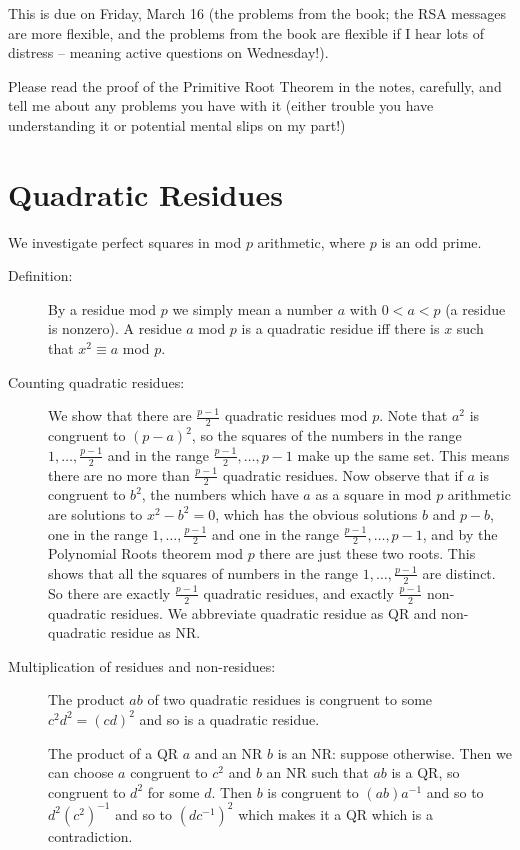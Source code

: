 \documentclass[12pt]{article}
\begin{document}
This is due on Friday, March 16 (the problems from the book; the RSA messages are more flexible, and the problems from the book are flexible if I hear lots of distress -- meaning active questions on Wednesday!).

Please read the proof of the Primitive Root Theorem in the notes, carefully, and tell me about any problems you have with it (either trouble you have understanding it or potential mental slips on my part!)

\section{Quadratic Residues}

We investigate perfect squares in mod $p$ arithmetic, where $p$ is an odd prime.

\begin{description}

\item[Definition:]  By a residue mod $p$ we simply mean a number $a$ with $0 < a <p$ (a residue is nonzero).  A residue $a$ mod $p$ is a quadratic residue iff there is $x$ such that $x^2 \equiv a$ mod $p$.

\item[Counting quadratic residues:]  We show that there are $\frac{p-1}2$ quadratic residues mod $p$.   Note that $a^2$ is congruent to $(p-a)^2$, so the squares of the numbers in the range $1,\ldots,\frac{p-1}2$ and in the range $\frac{p-1}2,\ldots,p-1$ make up the same set.
This means there are no more than $\frac{p-1}2$ quadratic residues.   Now observe that if $a$ is congruent to $b^2$, the numbers which have $a$ as a square in mod $p$ arithmetic are solutions to $x^2-b^2=0$, which has the obvious solutions $b$ and $p-b$, one in  the range $1,\ldots,\frac{p-1}2$ and one in the range $\frac{p-1}2,\ldots,p-1$, and by the Polynomial Roots theorem mod $p$ there are just these two roots.   This shows that all the squares of numbers in the range $1,\ldots,\frac{p-1}2$
are distinct.  So there are exactly $\frac{p-1}2$ quadratic residues, and exactly $\frac{p-1}2$ non-quadratic residues.   We abbreviate quadratic residue as QR and non-quadratic residue as NR.

\item[Multiplication of residues and non-residues:]   The product $ab$ of two quadratic residues is congruent to some $c^2d^2=(cd)^2$ and so is a quadratic residue.

The product of a QR $a$ and an NR $b$ is an NR:  suppose otherwise.  Then we can choose $a$ congruent to $c^2$ and $b$ an NR such that $ab$ is a QR, so congruent to $d^2$ for some $d$.   Then $b$ is congruent to $(ab)a^{-1}$ and
so to $d^2(c^2)^{-1}$ and so to $(dc^{-1})^2$ which makes it a QR which is a contradiction.


\end{description}
\end{document}
